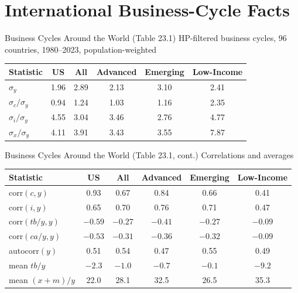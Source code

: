 \documentclass[blue]{beamer}
\begin{document}
\section{International Business-Cycle Facts}

\begin{frame}{Business Cycles Around the World (Table 23.1)}
HP-filtered business cycles, 96 countries, 1980--2023, population-weighted
\begin{table}
\centering
\small
\setlength{\tabcolsep}{4pt}
\begin{tabular}{lccccc}
\toprule
Statistic & US & All & Advanced & Emerging & Low-Income \\
\midrule
$\sigma_y$ & 1.96 & 2.89 & 2.13 & 3.10 & 2.41 \\
$\sigma_c/\sigma_y$ & 0.94 & 1.24 & 1.03 & 1.16 & 2.35 \\
$\sigma_i/\sigma_y$ & 4.55 & 3.04 & 3.46 & 2.76 & 4.77 \\
$\sigma_x/\sigma_y$ & 4.11 & 3.91 & 3.43 & 3.55 & 7.87 \\
\bottomrule
\end{tabular}
\end{table}
\end{frame}

\begin{frame}{Business Cycles Around the World (Table 23.1, cont.)}
Correlations and averages
\begin{table}
\centering
\small
\setlength{\tabcolsep}{4pt}
\begin{tabular}{lccccc}
\toprule
Statistic & US & All & Advanced & Emerging & Low-Income \\
\midrule
corr$(c, y)$ & 0.93 & 0.67 & 0.84 & 0.66 & 0.41 \\
corr$(i, y)$ & 0.65 & 0.70 & 0.76 & 0.71 & 0.47 \\
corr$(tb/y, y)$ & $-0.59$ & $-0.27$ & $-0.41$ & $-0.27$ & $-0.09$ \\
corr$(ca/y, y)$ & $-0.53$ & $-0.31$ & $-0.36$ & $-0.32$ & $-0.09$ \\
autocorr$(y)$ & 0.51 & 0.54 & 0.47 & 0.55 & 0.49 \\
mean $tb/y$ & $-2.3$ & $-1.0$ & $-0.7$ & $-0.1$ & $-9.2$ \\
mean $(x+m)/y$ & 22.0 & 28.1 & 32.5 & 26.5 & 35.3 \\
\bottomrule
\end{tabular}
\end{table}
\end{frame}
\end{document}
